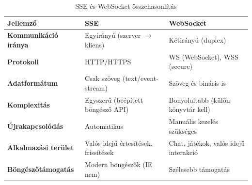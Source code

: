 \documentclass{thesis-ekf}
\theoremstyle{definition}
\theoremstyle{remark}
\begin{document}
	\begin{table}[!hb]
		\centering
		\caption{SSE és WebSocket összehasonlítás}
		\label{tab_sse_v_websocket}
		\begin{tabular}{|l|l|p{5cm}|}
			\hline
			\textbf{Jellemző}         & \textbf{SSE}                          & \textbf{WebSocket}                  \\ \hline
			\textbf{Kommunikáció iránya}       & Egyirányú (szerver $\rightarrow$ kliens) & Kétirányú (duplex)                  \\ \hline
			\textbf{Protokoll}                 & HTTP/HTTPS                            & WS (WebSocket), WSS (secure)        \\ \hline
			\textbf{Adatformátum}              & Csak szöveg (text/event-stream)       & Szöveg és bináris is                \\ \hline
			\textbf{Komplexitás}               & Egyszerű (beépített böngésző API)     & Bonyolultabb (külön könyvtár kell)  \\ \hline
			\textbf{Újrakapcsolódás}           & Automatikus                           & Manuális kezelés szükséges          \\ \hline
			\textbf{Alkalmazási terület}       & Valós idejű értesítések, frissítések  & Chat, játékok, valós idejű interakció \\ \hline
			\textbf{Böngészőtámogatás}        & Modern böngészők (IE nem)            & Szélesebb támogatás                 \\ \hline
		\end{tabular}
	\end{table}
\end{document}
